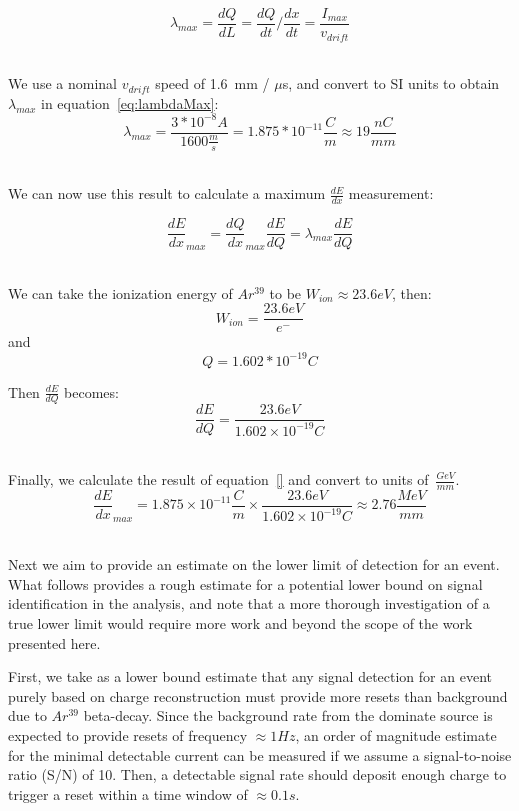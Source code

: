 \begin{equation}
\lambda_{max} = \frac{dQ}{dL} = \frac{dQ}{dt} / \frac{dx}{dt} = \frac{I_{max}}{v_{drift}}
\end{equation}
~\label{eq:lambdaMax}

We use a nominal $v_{drift}$ speed of 1.6~\unit{mm} / $\mu$s, and convert to SI units to obtain $\lambda_{max}$ in equation~\ref{eq:lambdaMax}:
\begin{equation}
\lambda_{max} = \frac{3*10^{-8} A}{1600 \frac{m}{s}} = 1.875*10^{-11} \frac{C}{m} \approx 19 \frac{nC}{mm}
\end{equation}
~\label{eq:lambdaCalc}

We can now use this result to calculate a maximum $\frac{dE}{dx}$ measurement:

\begin{equation}
\frac{dE}{dx}_{max} = \frac{dQ}{dx}_{max}\frac{dE}{dQ} = \lambda_{max}\frac{dE}{dQ}
\end{equation}
~\label{eq:dedxMax}

We can take the ionization energy of $Ar^{39}$ to be $W_{ion} \approx 23.6 eV$, then:
$$
W_{ion} = \frac{23.6 eV}{e^{-}}
$$
and
$$
Q = 1.602*10^{-19} C
$$

Then $\frac{dE}{dQ}$ becomes:
\begin{equation}
\frac{dE}{dQ} = \frac{23.6 eV}{1.602\times 10^{-19} C}
\end{equation}
~\label{eq:dedxValue}

Finally, we calculate the result of equation~\ref{} and convert to units of~$\frac{GeV}{mm}$.
\begin{equation}
\frac{dE}{dx}_{max} = 1.875\times 10^{-11} \frac{C}{m} \times  \frac{23.6 eV}{1.602\times 10^{-19} C} \approx 2.76 \frac{MeV}{mm}
\end{equation}
~\label{eq:dedxCalc}

Next we aim to provide an estimate on the lower limit of detection for an event.
What follows provides a rough estimate for a potential lower bound on signal identification in the analysis, and note that a more thorough investigation of a true lower limit would require more work and beyond the scope of the work presented here.

First, we take as a lower bound estimate that any signal detection for an event purely based on charge reconstruction must provide more resets than background due to $Ar^{39}$ beta-decay.
Since the background rate from the dominate source is expected to provide resets of frequency $\approx 1\unit{Hz}$, an order of magnitude estimate for the minimal detectable current can be measured if we assume a signal-to-noise ratio (S/N) of 10.
Then, a detectable signal rate should deposit enough charge to trigger a reset within a time window of $\approx 0.1 \unit{s}$.


